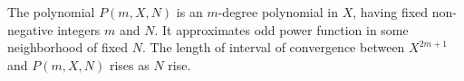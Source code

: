 The polynomial $P(m,X,N)$ is an $m$-degree polynomial in $X$, having fixed non-negative
integers $m$ and $N$.
It approximates odd power function in some neighborhood of fixed $N$.
The length of interval of convergence between $X^{2m+1}$ and $P(m,X,N)$ rises as $N$ rise.
